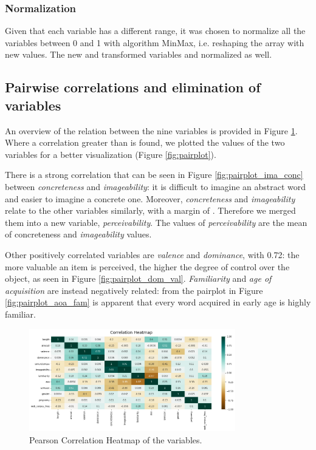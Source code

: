 \documentclass[a4paper,11pt,dvipsnames]{article}
\begin{document}
\subsubsection{Normalization}\label{normalization}

Given that each variable has a different range, it was chosen to normalize all the variables between 0 and 1 with algorithm MinMax, i.e. reshaping the array with new values. The new and transformed variables and normalized as well.



\subsection[Pairwise correlations]{Pairwise correlations and elimination of variables}
An overview of the relation between the nine variables is provided in Figure \ref{fig:correlation}. Where a correlation greater than \textbar{} is found, we plotted the values of the two variables for a better visualization (Figure \ref{fig:pairplot}). 

There is a strong correlation that can be seen in Figure \ref{fig:pairplot_ima_conc} between \textit{concreteness} and \textit{imageability}: it is difficult to imagine an abstract word and easier to imagine a concrete one.  Moreover, \textit{concreteness} and \textit{imageability} relate to the other variables similarly, with a margin of . Therefore we merged them into a new variable, \textit{perceivability}. The values of \textit{perceivability} are the mean of concreteness and \textit{imageability} values. 

Other positively correlated variables are \textit{valence} and \textit{dominance}, with 0.72: the more valuable an item is perceived, the higher the degree of control over the object, as seen in Figure \ref{fig:pairplot_dom_val}. 
\textit{Familiarity} and \textit{age of acquisition} are instead negatively related: from the pairplot in Figure \ref{fig:pairplot_aoa_fam} is apparent that every word acquired in early age is highly familiar. 


\begin{figure}[h]
    \centering
    \includegraphics[width=0.8\textwidth]{Graphs/heatmap.png}
    \caption{Pearson Correlation Heatmap of the variables.}
    \label{fig:correlation}
\end{figure}
\end{document}
